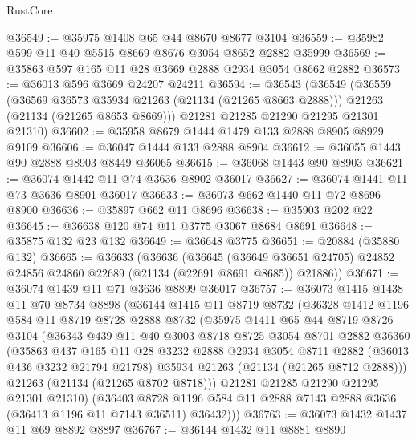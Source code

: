 \begin{lexlean}{RustCore}
\begin{coremodule}
@36549 := @35975 @1408 @65 @44 @8670 @8677 @3104
@36559 := @35982 @599 @11 @40 @5515 @8669 @8676 @3054 @8652 @2882 @35999
@36569 := @35863 @597 @165 @11 @28 @3669 @2888 @2934 @3054 @8662 @2882
@36573 := @36013 @596 @3669 @24207 @24211
@36594 := @36543
    (@36549
      (@36559
        (@36569 @36573 @35934 @21263 (@21134 (@21265 @8663 @2888)))
        @21263
        (@21134 (@21265 @8653 @8669)))
      @21281
      @21285
      @21290
      @21295
      @21301
      @21310)
@36602 := @35958 @8679 @1444 @1479 @133 @2888 @8905 @8929 @9109
@36606 := @36047 @1444 @133 @2888 @8904
@36612 := @36055 @1443 @90 @2888 @8903 @8449 @36065
@36615 := @36068 @1443 @90 @8903
@36621 := @36074 @1442 @11 @74 @3636 @8902 @36017
@36627 := @36074 @1441 @11 @73 @3636 @8901 @36017
@36633 := @36073 @662 @1440 @11 @72 @8696 @8900
@36636 := @35897 @662 @11 @8696
@36638 := @35903 @202 @22
@36645 := @36638 @120 @74 @11 @3775 @3067 @8684 @8691
@36648 := @35875 @132 @23 @132
@36649 := @36648 @3775
@36651 := @20884 (@35880 @132)
@36665 := @36633
    (@36636
      (@36645
        (@36649 @36651 @24705)
        @24852
        @24856
        @24860
        @22689
        (@21134 (@22691 @8691 @8685))
        @21886))
@36671 := @36074 @1439 @11 @71 @3636 @8899 @36017
@36757 := @36073
    @1415
    @1438
    @11
    @70
    @8734
    @8898
    (@36144
      @1415
      @11
      @8719
      @8732
      (@36328
        @1412
        @1196
        @584
        @11
        @8719
        @8728
        @2888
        @8732
        (@35975
          @1411
          @65
          @44
          @8719
          @8726
          @3104
          (@36343
            @439
            @11
            @40
            @3003
            @8718
            @8725
            @3054
            @8701
            @2882
            @36360
            (@35863
              @437
              @165
              @11
              @28
              @3232
              @2888
              @2934
              @3054
              @8711
              @2882
              (@36013 @436 @3232 @21794 @21798)
              @35934
              @21263
              (@21134 (@21265 @8712 @2888)))
            @21263
            (@21134 (@21265 @8702 @8718)))
          @21281
          @21285
          @21290
          @21295
          @21301
          @21310)
        (@36403
          @8728
          @1196
          @584
          @11
          @2888
          @7143
          @2888
          @3636
          (@36413 @1196 @11 @7143 @36511)
          @36432)))
@36763 := @36073 @1432 @1437 @11 @69 @8892 @8897
@36767 := @36144 @1432 @11 @8881 @8890

\end{coremodule}
\end{lexlean}
